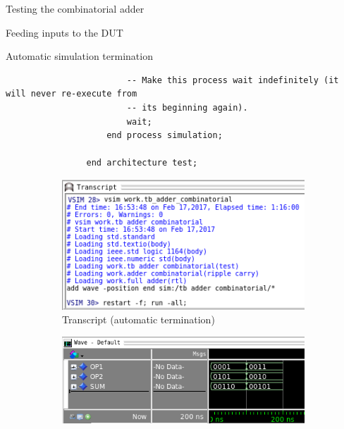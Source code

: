 \documentclass[a4paper, 12pt, onecolumn]{article}
\begin{document}
\begin{section}{Testing the combinatorial adder}
\begin{subsection}{Feeding inputs to the DUT}
\begin{subsubsection}{Automatic simulation termination}
\begin{verbatim}
                        -- Make this process wait indefinitely (it will never re-execute from
                        -- its beginning again).
                        wait;
                    end process simulation;

                end architecture test;
            \end{verbatim}
            \vspace{-1em}

            \begin{figure}[!h]
                \centering
                \begin{subfigure}[t]{0.4\textwidth}
                    \centering
                    \includegraphics[width=1.0\textwidth]{figs/waveform_combinatorial_transcript_automatic_termination.png}
                    \caption{Transcript (automatic termination)}
                    \label{fig:waveform_combinatorial_transcript_automatically_terminates}
                \end{subfigure}
                \hspace{1em}
                \begin{subfigure}[t]{0.55\textwidth}
                    \centering
                    \includegraphics[width=1.0\textwidth]{figs/waveform_combinatorial_process_automatic_termination.png}

\end{subfigure}
\end{figure}
\end{subsubsection}
\end{subsection}
\end{section}
\end{document}
